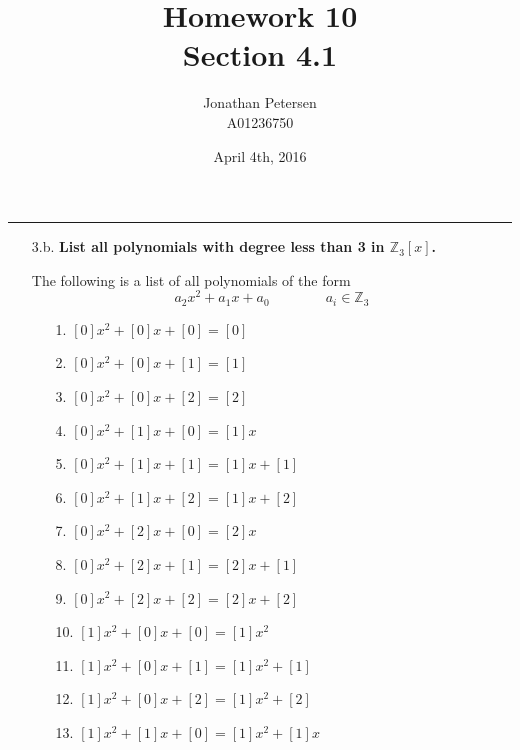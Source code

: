 \documentclass{article}
\title{Homework 10 \\ Section 4.1}
\author{Jonathan Petersen \\ A01236750}
\date{April 4th, 2016}
\begin{document}
	\maketitle
	\hrule 
	\vspace{5mm}
	\begin{enumerate}
		\item [3.b.] \textbf{List all polynomials with degree less than 3 in $\mathbb{Z}_3[x]$.}

			The following is a list of all polynomials of the form
			\begin{equation*}
				a_2x^2 + a_1x + a_0 \qquad \qquad a_i \in \mathbb{Z}_3
			\end{equation*}

			\begin{enumerate}
				\item [1.] $[0]x^2 + [0]x + [0] = [0]$ \\
				\item [2.] $[0]x^2 + [0]x + [1] = [1]$ \\
				\item [3.] $[0]x^2 + [0]x + [2] = [2]$ \\
				\item [4.] $[0]x^2 + [1]x + [0] = [1]x$ \\
				\item [5.] $[0]x^2 + [1]x + [1] = [1]x + [1]$ \\
				\item [6.] $[0]x^2 + [1]x + [2] = [1]x + [2]$ \\
				\item [7.] $[0]x^2 + [2]x + [0] = [2]x$ \\
				\item [8.] $[0]x^2 + [2]x + [1] = [2]x + [1]$ \\
				\item [9.] $[0]x^2 + [2]x + [2] = [2]x + [2]$ \\
				\item [10.] $[1]x^2 + [0]x + [0] = [1]x^2$ \\
				\item [11.] $[1]x^2 + [0]x + [1] = [1]x^2 + [1]$ \\
				\item [12.] $[1]x^2 + [0]x + [2] = [1]x^2 + [2]$ \\
				\item [13.] $[1]x^2 + [1]x + [0] = [1]x^2 + [1]x$ \\

\end{enumerate}
\end{enumerate}
\end{document}
